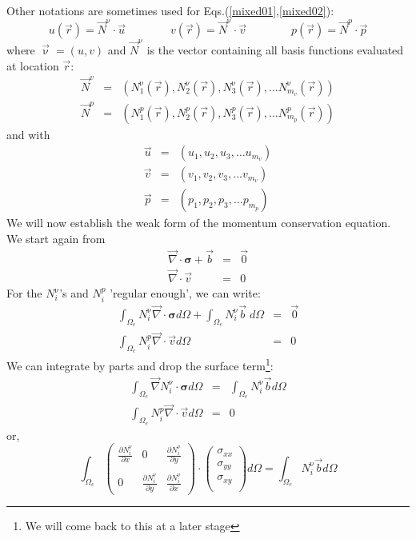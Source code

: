Other notations are sometimes used for Eqs.(\ref{mixed01},\ref{mixed02}):
\begin{equation}
u({\vec r}) = \vec{N}^\upnu \cdot \vec{u}
\quad\quad\quad\quad
v({\vec r}) = \vec{N}^\upnu \cdot \vec{v}
\quad\quad\quad\quad
p({\vec r}) = \vec{N}^p \cdot \vec{p}
\end{equation} 
where ${\vec \upnu}=(u,v)$ and $\vec{N}^\upnu$ is the vector containing all basis functions evaluated at location ${\vec r}$:
\begin{eqnarray}
\vec{N}^v &=& \left( N_1^\upnu({\vec r}),  N_2^\upnu({\vec r}),  N_3^\upnu({\vec r}), \dots  N_{m_v}^\upnu({\vec r}) \right) \\
\vec{N}^p &=& \left( N_1^p({\vec r}),  N_2^p({\vec r}),  N_3^p({\vec r}), \dots  N_{m_p}^p({\vec r}) \right)
\end{eqnarray}
and with 
\begin{eqnarray}
\vec{u} &=& \left( u_1,  u_2,  u_3, \dots  u_{m_v} \right) \\
\vec{v} &=& \left( v_1,  v_2,  v_3, \dots  v_{m_v} \right) \\
\vec{p} &=& \left( p_1,  p_2,  p_3, \dots  p_{m_p} \right) 
\end{eqnarray}
We will now establish the weak form of the momentum conservation equation. 
We start again from 
\begin{eqnarray}
{\vec \nabla}\cdot {\bm \sigma} + {\vec b} &=& {\vec 0} \\
{\vec \nabla}\cdot {\vec v} &=& 0
\end{eqnarray}
For the $N_i^\upnu$'s and $N_i^p$ 'regular enough', we can write:
\begin{eqnarray}
\int_{\Omega_e} N_i^\upnu {\vec \nabla}\cdot {\bm \sigma} d\Omega + \int_{\Omega_e} N_i^\upnu  {\vec b} \; d\Omega 
&=& \vec 0 \\
\int_{\Omega_e} N_i^p {\vec \nabla}\cdot {\vec v} d\Omega &=& 0
\end{eqnarray}
We can integrate by parts and drop the surface term\footnote{We will come back to this at a later stage}:
\begin{eqnarray}
\int_{\Omega_e} {\vec \nabla } N_i^\upnu \cdot {\bm \sigma} d\Omega &=& \int_{\Omega_e} N_i^\upnu  {\vec b} d\Omega \\
\int_{\Omega_e} N_i^p {\vec \nabla}\cdot {\vec v} d\Omega &=& 0
\end{eqnarray}
or, 
\begin{equation}
\int_{\Omega_e} 
\left(
\begin{array}{ccc}
\frac{\partial N_i^\upnu}{\partial x} & 0 & \frac{\partial N_i^\upnu}{\partial y} \\  \\
0 & \frac{\partial N_i^\upnu}{\partial y} &  \frac{\partial N_i^\upnu}{\partial x}  
\end{array}
\right)
\cdot
\left(
\begin{array}{c}
\sigma_{xx}\\
\sigma_{yy}\\
\sigma_{xy}\\
\end{array}
\right)
d\Omega = \int_{\Omega_e} N_i^\upnu {\vec b} d\Omega 
\end{equation}
